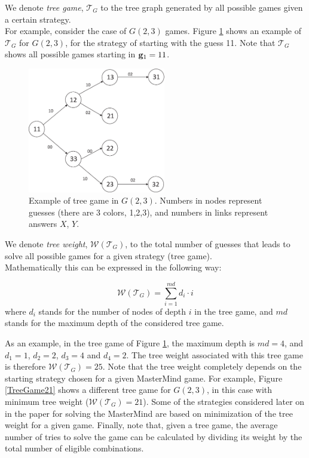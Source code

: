  We denote {\em tree game}, $\mathcal{T}_G$ to the tree graph generated by all possible games given a certain strategy.\\

For example, consider the case of $G(2,3)$ games. Figure \ref{TreeGame25} shows an example of $\mathcal{T}_G$ for $G(2,3)$, for the strategy of starting with the guess 11. Note that $\mathcal{T}_G$ shows all possible games starting in ${\bf g}_1=11$.\\

\begin{figure}[!ht]
\begin{center}
\includegraphics[draft=false,angle=0,width=6cm]{./arbol_peso25.eps}
\end{center}
\caption{\label{TreeGame25} Example of tree game in $G(2,3)$. Numbers in nodes represent guesses (there are 3 colors, 1,2,3), and numbers in links represent answers $X$, $Y$.}
\end{figure}

 We denote {\em tree weight}, $\mathcal{W}(\mathcal{T}_G)$, to the total number of guesses that leads to solve all possible games for a given strategy (tree game).\\

Mathematically this can be expressed in the following way:

\begin{equation}
 \mathcal{W}(\mathcal{T}_G)=\sum_{i=1}^{md} d_i \cdot i
\end{equation}
where $d_i$ stands for the number of nodes of depth $i$ in the tree game, and $md$ stands for the maximum depth of the considered tree game.

As an example, in the tree game of Figure \ref{TreeGame25}, the maximum depth is $md=4$, and $d_1=1$, $d_2=2$, $d_3=4$ and $d_4=2$. The tree weight associated with this tree game is therefore $\mathcal{W}(\mathcal{T}_G)=25$. Note that the tree weight completely depends on the starting strategy chosen for a given MasterMind game. For example, Figure \ref{TreeGame21} shows a different tree game for $G(2,3)$, in this case with minimum tree weight ($\mathcal{W}(\mathcal{T}_G)=21$). Some of the strategies considered later on in the paper for solving the MasterMind are based on minimization of the tree weight for a given game. Finally, note that, given a tree game, the average number of tries to solve the game can be calculated by dividing its weight by the total number of eligible combinations.

